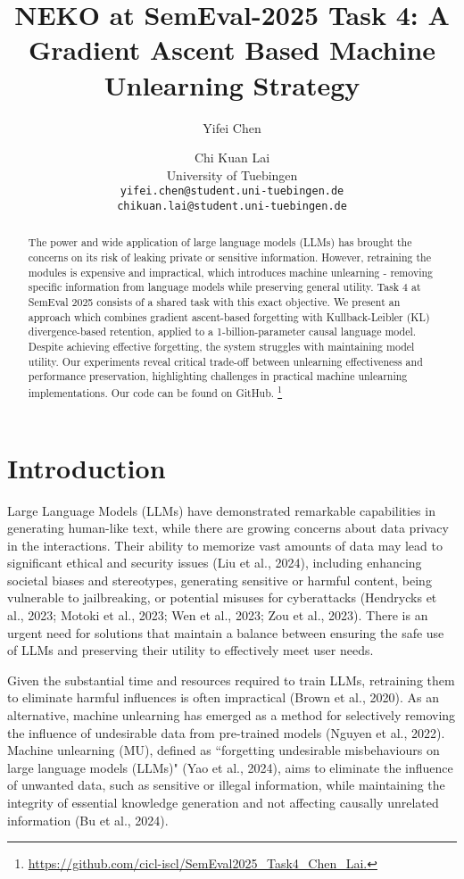 \documentclass[11pt]{article}
\title{NEKO at SemEval-2025 Task 4: A Gradient Ascent Based Machine Unlearning Strategy}
\author{Yifei Chen \and Chi Kuan Lai \\
  University of Tuebingen \\
  \texttt{yifei.chen@student.uni-tuebingen.de} \\
  \texttt{chikuan.lai@student.uni-tuebingen.de} \\}
\begin{document}
\maketitle
\begin{abstract}
The power and wide application of large language models (LLMs) has brought the concerns on its risk of leaking private or sensitive information. However, retraining the modules is expensive and impractical, which introduces machine unlearning - removing specific information from language models while preserving general utility. Task 4 at SemEval 2025 consists of a shared task with this exact objective. We present an approach which combines gradient ascent-based forgetting with Kullback-Leibler (KL) divergence-based retention, applied to a 1-billion-parameter causal language model. Despite achieving effective forgetting, the system struggles with maintaining model utility. Our experiments reveal critical trade-off between unlearning effectiveness and performance preservation, highlighting challenges in practical machine unlearning implementations. Our code can be found on GitHub. \footnote{\url{https://github.com/cicl-iscl/SemEval2025_Task4_Chen_Lai.}}
\end{abstract}

\section{Introduction}

Large Language Models (LLMs) have demonstrated remarkable capabilities in generating human-like text, while there are growing concerns about data privacy in the interactions. Their ability to memorize vast amounts of data may lead to significant ethical and security issues (Liu et al., 2024), including enhancing societal biases and stereotypes, generating sensitive or harmful content, being vulnerable to jailbreaking, or potential misuses for cyberattacks \citep{HendrycksDan2023AOoC} (Hendrycks et al., 2023; Motoki et al., 2023; Wen et al., 2023; Zou et al., 2023). There is an urgent need for solutions that maintain a balance between ensuring the safe use of LLMs and preserving their utility to effectively meet user needs.

Given the substantial time and resources required to train LLMs, retraining them to eliminate harmful influences is often impractical (Brown et al., 2020). As an alternative, machine unlearning has emerged as a method for selectively removing the influence of undesirable data from pre-trained models (Nguyen et al., 2022). Machine unlearning (MU), defined as ``forgetting undesirable misbehaviours on large language models (LLMs)" (Yao et al., 2024), aims to eliminate the influence of unwanted data, such as sensitive or illegal information, while maintaining the integrity of essential knowledge generation and not affecting causally unrelated information (Bu et al., 2024). 
\end{document}
